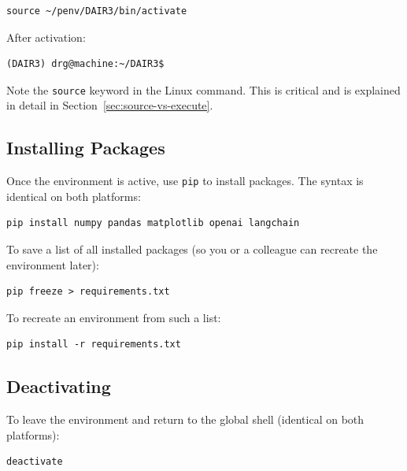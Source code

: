 \begin{lstlisting}[style=linuxStyle, caption={Activating a venv on Linux/WSL}]
source ~/penv/DAIR3/bin/activate
\end{lstlisting}

After activation:
\begin{lstlisting}[style=linuxStyle]
(DAIR3) drg@machine:~/DAIR3$
\end{lstlisting}

\begin{warningbox}
Note the \texttt{source} keyword in the Linux command. This is critical and
is explained in detail in Section~\ref{sec:source-vs-execute}.
\end{warningbox}

\subsection{Installing Packages}

Once the environment is active, use \texttt{pip} to install packages.
The syntax is identical on both platforms:

\begin{lstlisting}[style=inlineStyle, caption={Installing packages with pip}]
pip install numpy pandas matplotlib openai langchain
\end{lstlisting}

To save a list of all installed packages (so you or a colleague can
recreate the environment later):

\begin{lstlisting}[style=inlineStyle]
pip freeze > requirements.txt
\end{lstlisting}

To recreate an environment from such a list:

\begin{lstlisting}[style=inlineStyle]
pip install -r requirements.txt
\end{lstlisting}

\subsection{Deactivating}

To leave the environment and return to the global shell (identical on
both platforms):

\begin{lstlisting}[style=inlineStyle]
deactivate
\end{lstlisting}

